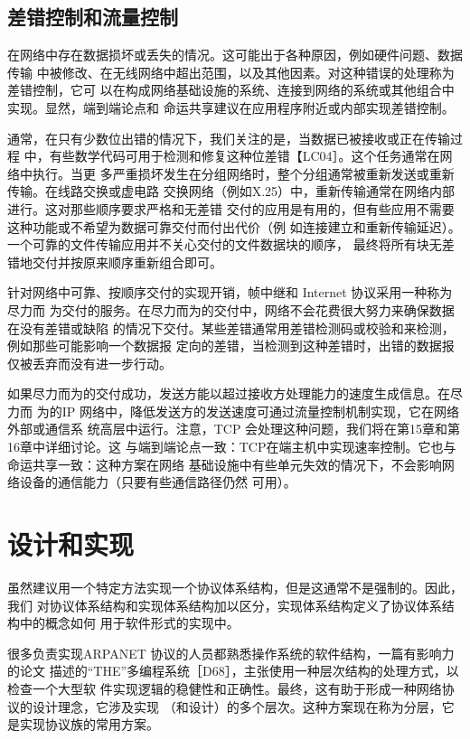 \subsection{差错控制和流量控制}

在网络中存在数据损坏或丢失的情况。这可能出于各种原因，例如硬件问题、数据传输
中被修改、在无线网络中超出范围，以及其他因素。对这种错误的处理称为差错控制，它可
以在构成网络基础设施的系统、连接到网络的系统或其他组合中实现。显然，端到端论点和
命运共享建议在应用程序附近或内部实现差错控制。

通常，在只有少数位出错的情况下，我们关注的是，当数据已被接收或正在传输过程
中，有些数学代码可用于检测和修复这种位差错【LC04］。这个任务通常在网络中执行。当更
多严重损坏发生在分组网络时，整个分组通常被重新发送或重新传输。在线路交换或虚电路
交换网络（例如X.25）中，重新传输通常在网络内部进行。这对那些顺序要求严格和无差错
交付的应用是有用的，但有些应用不需要这种功能或不希望为数据可靠交付而付出代价（例
如连接建立和重新传输延迟）。一个可靠的文件传输应用并不关心交付的文件数据块的顺序，
最终将所有块无差错地交付并按原来顺序重新组合即可。

针对网络中可靠、按顺序交付的实现开销，帧中继和 Internet 协议采用一种称为尽力而
为交付的服务。在尽力而为的交付中，网络不会花费很大努力来确保数据在没有差错或缺陷
的情况下交付。某些差错通常用差错检测码或校验和来检测，例如那些可能影响一个数据报
定向的差错，当检测到这种差错时，出错的数据报仅被丢弃而没有进一步行动。

如果尽力而为的交付成功，发送方能以超过接收方处理能力的速度生成信息。在尽力而
为的IP 网络中，降低发送方的发送速度可通过流量控制机制实现，它在网络外部或通信系
统高层中运行。注意，TCP 会处理这种问题，我们将在第15章和第16章中详细讨论。这
与端到端论点一致：TCP在端主机中实现速率控制。它也与命运共享一致：这种方案在网络
基础设施中有些单元失效的情况下，不会影响网络设备的通信能力（只要有些通信路径仍然
可用）。

\section{设计和实现}
虽然建议用一个特定方法实现一个协议体系结构，但是这通常不是强制的。因此，我们
对协议体系结构和实现体系结构加以区分，实现体系结构定义了协议体系结构中的概念如何
用于软件形式的实现中。

很多负责实现ARPANET 协议的人员都熟悉操作系统的软件结构，一篇有影响力的论文
描述的“THE”多编程系统［D68］，主张使用一种层次结构的处理方式，以检查一个大型软
件实现逻辑的稳健性和正确性。最终，这有助于形成一种网络协议的设计理念，它涉及实现
（和设计）的多个层次。这种方案现在称为分层，它是实现协议族的常用方案。

